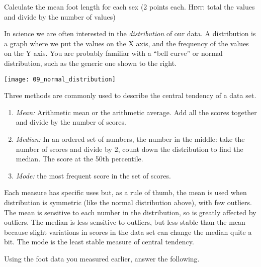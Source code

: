 \documentclass[12pt, addpoints, hidelinks]{exam}
\begin{document}
\begin{questions}
\question[4]\label{mean_foot}
Calculate the mean foot length for each sex (2 points each. \textsc{Hint}:
total the values and divide by the number of values)


\begin{multicols}{2}

In science we are often interested in the \emph{distribution} of our
data. A distribution is a graph where we put the values on the X axis,
and the frequency of the values on the Y axis. You are probably familiar
with a ``bell curve'' or normal distribution, such as the generic one
shown to the right.

\columnbreak

\texttt{[image: 09\_normal\_distribution]}

\end{multicols}

Three methods are commonly used to describe the central tendency of a data set. 

\begin{enumerate}[label=\textsc{\alph*.}, leftmargin=*]

	\item \emph{Mean:} Arithmetic mean or the
arithmetic average. Add all the scores together and divide by the number
of scores.

	\item \emph{Median:} In an ordered set of numbers, the number in the middle:
take the number of scores and divide by 2, count down the distribution
to find the median. The score at the 50th percentile.

	\item \emph{Mode:} the most frequent score in the set of
scores.

\end{enumerate}

Each measure has specific uses but, as a rule of thumb, the mean is used when distribution is symmetric (like the normal distribution above), with few outliers. The mean is sensitive to each number in the distribution, so is greatly affected by outliers.  The median is less sensitive to outliers, but less stable than the mean because slight variations in scores in the data set can change the median quite a bit. The mode is the least stable measure of central tendency.

Using the foot data you measured earlier, answer the following.

\vspace*{0.5\baselineskip}


\end{questions}
\end{document}
